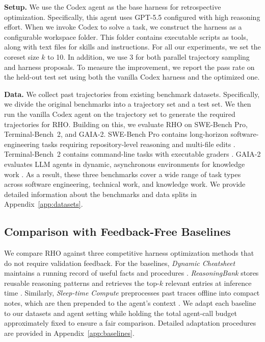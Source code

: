 \documentclass{llmxive}
\providecommand{\method}{\textsc{RHO}}
\begin{document}
\noindent\textbf{Setup.}
We use the Codex agent \citep{openai2025codex} as the base harness for retrospective optimization.
Specifically, this agent uses GPT-5.5 \citep{openai2026gpt55} configured with high reasoning effort.
When we invoke Codex to solve a task, we construct the harness as a configurable workspace folder.
This folder contains executable scripts as tools, along with text files for skills and instructions.
For all our experiments, we set the coreset size $k$ to 10.
In addition, we use 3 for both parallel trajectory sampling and harness proposals.
To measure the improvement, we report the pass rate on the held-out test set using both the vanilla Codex harness and the optimized one.

\noindent\textbf{Data.}
We collect past trajectories from existing benchmark datasets.
Specifically, we divide the original benchmarks into a trajectory set and a test set.
We then run the vanilla Codex agent on the trajectory set to generate the required trajectories for \method{}.
Building on this, we evaluate \method{} on SWE-Bench Pro, Terminal-Bench~2, and \mbox{GAIA-2}.
SWE-Bench Pro contains long-horizon software-engineering tasks requiring repository-level reasoning and multi-file edits \citep{deng2025swebenchpro}.
Terminal-Bench~2 contains command-line tasks with executable graders \citep{terminalbench2}.
\mbox{GAIA-2} evaluates LLM agents in dynamic, asynchronous environments for knowledge work \citep{froger2026gaia2}.
As a result, these three benchmarks cover a wide range of task types across software engineering, technical work, and knowledge work.
We provide detailed information about the benchmarks and data splits in Appendix~\ref{app:datasets}.

\subsection{Comparison with Feedback-Free Baselines}

We compare \method{} against three competitive harness optimization methods that do not require validation feedback.
For the baselines, \textit{Dynamic Cheatsheet} maintains a running record of useful facts and procedures \citep{suzgun2025dynamiccheatsheet}.
\textit{ReasoningBank} stores reusable reasoning patterns and retrieves the top-$k$ relevant entries at inference time \citep{ouyang2026reasoningbank}.
Similarly, \textit{Sleep-time Compute} preprocesses past traces offline into compact notes, which are then prepended to the agent's context \citep{lin2025sleeptime}.
We adapt each baseline to our datasets and agent setting while holding the total agent-call budget approximately fixed to ensure a fair comparison.
Detailed adaptation procedures are provided in Appendix~\ref{app:baselines}.
\end{document}

